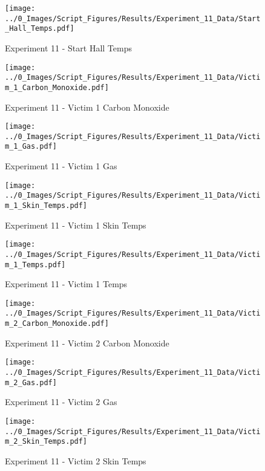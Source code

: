 	\begin{figure}[H]
		\centering
		\texttt{[image: ../0\_Images/Script\_Figures/Results/Experiment\_11\_Data/Start\_Hall\_Temps.pdf]}
		\caption[]{Experiment 11 - Start Hall Temps}
	\end{figure}
 
	\clearpage

	\begin{figure}[H]
		\centering
		\texttt{[image: ../0\_Images/Script\_Figures/Results/Experiment\_11\_Data/Victim\_1\_Carbon\_Monoxide.pdf]}
		\caption[]{Experiment 11 - Victim 1 Carbon Monoxide}
	\end{figure}
 

	\begin{figure}[H]
		\centering
		\texttt{[image: ../0\_Images/Script\_Figures/Results/Experiment\_11\_Data/Victim\_1\_Gas.pdf]}
		\caption[]{Experiment 11 - Victim 1 Gas}
	\end{figure}
 
	\clearpage

	\begin{figure}[H]
		\centering
		\texttt{[image: ../0\_Images/Script\_Figures/Results/Experiment\_11\_Data/Victim\_1\_Skin\_Temps.pdf]}
		\caption[]{Experiment 11 - Victim 1 Skin Temps}
	\end{figure}
 

	\begin{figure}[H]
		\centering
		\texttt{[image: ../0\_Images/Script\_Figures/Results/Experiment\_11\_Data/Victim\_1\_Temps.pdf]}
		\caption[]{Experiment 11 - Victim 1 Temps}
	\end{figure}
 
	\clearpage

	\begin{figure}[H]
		\centering
		\texttt{[image: ../0\_Images/Script\_Figures/Results/Experiment\_11\_Data/Victim\_2\_Carbon\_Monoxide.pdf]}
		\caption[]{Experiment 11 - Victim 2 Carbon Monoxide}
	\end{figure}
 

	\begin{figure}[H]
		\centering
		\texttt{[image: ../0\_Images/Script\_Figures/Results/Experiment\_11\_Data/Victim\_2\_Gas.pdf]}
		\caption[]{Experiment 11 - Victim 2 Gas}
	\end{figure}
 
	\clearpage

	\begin{figure}[H]
		\centering
		\texttt{[image: ../0\_Images/Script\_Figures/Results/Experiment\_11\_Data/Victim\_2\_Skin\_Temps.pdf]}
		\caption[]{Experiment 11 - Victim 2 Skin Temps}
	\end{figure}
 

